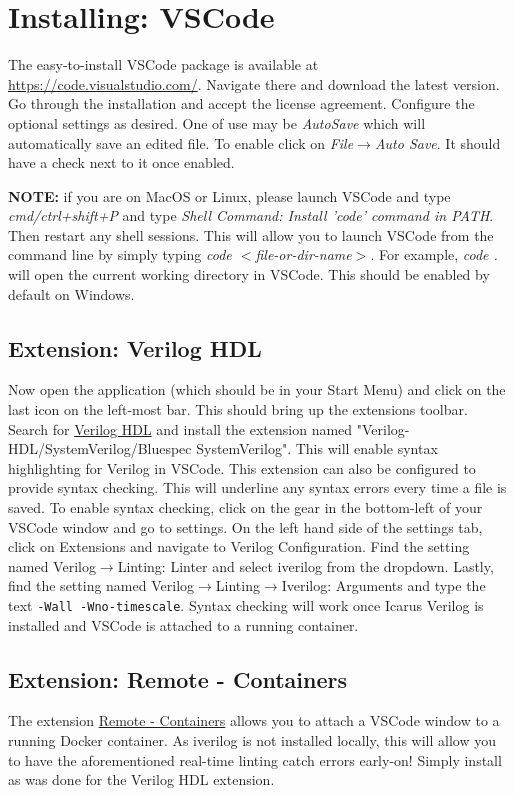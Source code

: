 \documentclass[11pt, letterpaper, titlepage, oneside]{memoir}
\begin{document}
    \section*{Installing: VSCode}
        The easy-to-install VSCode package is available at \url{https://code.visualstudio.com/}. Navigate there and download the latest version. Go through the installation and accept the license agreement. Configure the optional settings as desired. One of use may be \textit{AutoSave} which will automatically save an edited file. To enable click on \textit{File}$\rightarrow$\textit{Auto Save}. It should have a check next to it once enabled.

        \textbf{NOTE:} if you are on MacOS or Linux, please launch VSCode and type \textit{cmd/ctrl+shift+P} and type \textit{Shell Command: Install 'code' command in PATH}. Then restart any shell sessions. This will allow you to launch VSCode from the command line by simply typing \textit{code $<$file-or-dir-name$>$}. For example, \textit{code .} will open the current working directory in VSCode. This should be enabled by default on Windows.

        \subsection*{Extension: Verilog HDL}
            Now open the application (which should be in your Start Menu) and click on the last icon on the left-most bar. This should bring up the extensions toolbar. Search for \href{https://marketplace.visualstudio.com/items?itemName=mshr-h.VerilogHDL}{Verilog HDL} and install the extension named "Verilog-HDL/SystemVerilog/Bluespec SystemVerilog". This will enable syntax highlighting for Verilog in VSCode. This extension can also be configured to provide syntax checking. This will underline any syntax errors every time a file is saved. To enable syntax checking, click on the gear in the bottom-left of your VSCode window and go to settings. On the left hand side of the settings tab, click on Extensions and navigate to Verilog Configuration. Find the setting named Verilog$\rightarrow$Linting: Linter and select iverilog from the dropdown. Lastly, find the setting named Verilog$\rightarrow$Linting$\rightarrow$Iverilog: Arguments and type the text \texttt{-Wall -Wno-timescale}. Syntax checking will work once Icarus Verilog is installed and VSCode is attached to a running container.

		\subsection*{Extension: Remote - Containers}
		    The extension \href{https://marketplace.visualstudio.com/items?itemName=ms-vscode-remote.remote-containers}{Remote - Containers} allows you to attach a VSCode window to a running Docker container. As iverilog is not installed locally, this will allow you to have the aforementioned real-time linting catch errors early-on! Simply install as was done for the Verilog HDL extension.
			
\end{document}
